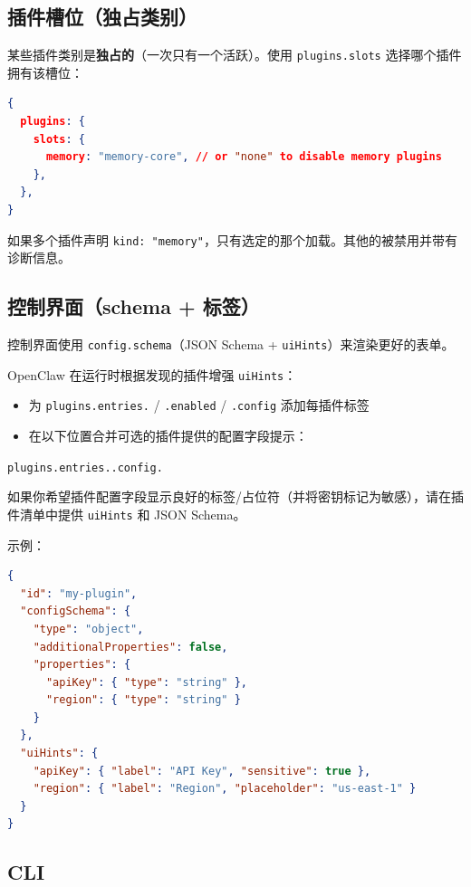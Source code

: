\subsection{插件槽位（独占类别）}


某些插件类别是\textbf{独占的}（一次只有一个活跃）。使用 \texttt{plugins.slots} 选择哪个插件拥有该槽位：

\begin{lstlisting}[language=json]
{
  plugins: {
    slots: {
      memory: "memory-core", // or "none" to disable memory plugins
    },
  },
}
\end{lstlisting}


如果多个插件声明 \texttt{kind: "memory"}，只有选定的那个加载。其他的被禁用并带有诊断信息。

\subsection{控制界面（schema + 标签）}


控制界面使用 \texttt{config.schema}（JSON Schema + \texttt{uiHints}）来渲染更好的表单。

OpenClaw 在运行时根据发现的插件增强 \texttt{uiHints}：

\begin{itemize}
  \item 为 \texttt{plugins.entries.} / \texttt{.enabled} / \texttt{.config} 添加每插件标签
  \item 在以下位置合并可选的插件提供的配置字段提示：
\end{itemize}

\texttt{plugins.entries..config.}

如果你希望插件配置字段显示良好的标签/占位符（并将密钥标记为敏感），请在插件清单中提供 \texttt{uiHints} 和 JSON Schema。

示例：

\begin{lstlisting}[language=json]
{
  "id": "my-plugin",
  "configSchema": {
    "type": "object",
    "additionalProperties": false,
    "properties": {
      "apiKey": { "type": "string" },
      "region": { "type": "string" }
    }
  },
  "uiHints": {
    "apiKey": { "label": "API Key", "sensitive": true },
    "region": { "label": "Region", "placeholder": "us-east-1" }
  }
}
\end{lstlisting}


\subsection{CLI}


